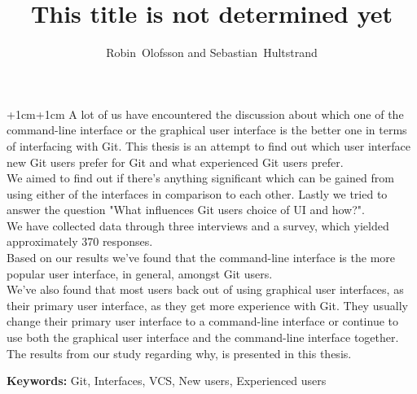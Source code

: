 \documentclass[a4paper,oneside]{bth} %
\begin{document}
		\abstract
		\begin{changemargin}{+1cm}{+1cm}
			\noindent
				A lot of us have encountered the discussion about which one of the command-line interface or the graphical user interface is the better one in terms of interfacing with Git.
				This thesis is an attempt to find out which user interface new Git users prefer for Git and what experienced Git users prefer.\\
				We aimed to find out if there's anything significant which can be gained from using either of the interfaces in comparison to each other. Lastly we tried to answer the question "What influences Git users choice of UI and how?".\\
				We have collected data through three interviews and a survey, which yielded approximately 370 responses.\\
				Based on our results we've found that the command-line interface is the more popular user interface, in general, amongst Git users.
				\\We've also found that most users back out of using graphical user interfaces, as their primary user interface, as they get more experience with Git. They usually change their primary user interface to a command-line interface or continue to use both the graphical user interface and the command-line interface together.
				The results from our study regarding why, is presented in this thesis.
				

			\par\vspace {1cm}
			\noindent
			\textbf{Keywords:} Git, Interfaces, VCS, New users, Experienced users
		\end{changemargin}

		\tableofcontents 
		\listoffigures %
		
		\cleardoublepage
		\pagestyle{headings}
		
		\title{This title is not determined yet}
		\author{Robin~Olofsson and Sebastian~Hultstrand}
		
\end{document}
